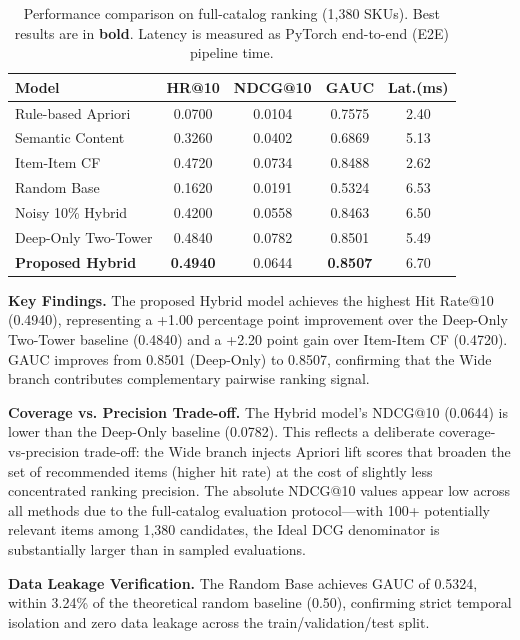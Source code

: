 \documentclass[10pt,conference]{IEEEtran}
\begin{document}
\begin{table}[t]
\centering
\caption{Performance comparison on full-catalog ranking (1,380 SKUs). Best results are in \textbf{bold}. Latency is measured as PyTorch end-to-end (E2E) pipeline time.}
\label{tab:main_results}
\begin{tabular}{lcccc}
\toprule
\textbf{Model} & \textbf{HR@10} & \textbf{NDCG@10} & \textbf{GAUC} & \textbf{Lat.(ms)} \\
\midrule
Rule-based Apriori      & 0.0700 & 0.0104 & 0.7575 & 2.40 \\
Semantic Content        & 0.3260 & 0.0402 & 0.6869 & 5.13 \\
Item-Item CF            & 0.4720 & 0.0734 & 0.8488 & 2.62 \\
Random Base             & 0.1620 & 0.0191 & 0.5324 & 6.53 \\
Noisy 10\% Hybrid      & 0.4200 & 0.0558 & 0.8463 & 6.50 \\
Deep-Only Two-Tower     & 0.4840 & 0.0782 & 0.8501 & 5.49 \\
\midrule
\textbf{Proposed Hybrid} & \textbf{0.4940} & 0.0644 & \textbf{0.8507} & 6.70 \\
\bottomrule
\end{tabular}
\end{table}

\textbf{Key Findings.} The proposed Hybrid model achieves the highest Hit Rate@10 (0.4940), representing a +1.00 percentage point improvement over the Deep-Only Two-Tower baseline (0.4840) and a +2.20 point gain over Item-Item CF (0.4720). GAUC improves from 0.8501 (Deep-Only) to 0.8507, confirming that the Wide branch contributes complementary pairwise ranking signal.

\textbf{Coverage vs. Precision Trade-off.} The Hybrid model's NDCG@10 (0.0644) is lower than the Deep-Only baseline (0.0782). This reflects a deliberate coverage-vs-precision trade-off: the Wide branch injects Apriori lift scores that broaden the set of recommended items (higher hit rate) at the cost of slightly less concentrated ranking precision. The absolute NDCG@10 values appear low across all methods due to the full-catalog evaluation protocol---with 100+ potentially relevant items among 1,380 candidates, the Ideal DCG denominator is substantially larger than in sampled evaluations.

\textbf{Data Leakage Verification.} The Random Base achieves GAUC of 0.5324, within 3.24\% of the theoretical random baseline (0.50), confirming strict temporal isolation and zero data leakage across the train/validation/test split.
\end{document}
